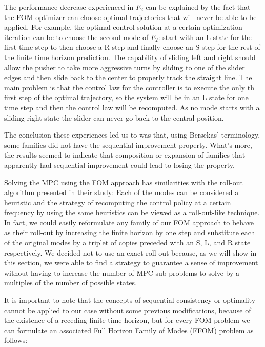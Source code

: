 \documentclass[12,twoside]{TFG-GM}
\theoremstyle{definition}
\theoremstyle{remark}
\begin{document}
The performance decrease experienced in $F_2$ can be explained by the fact that the FOM optimizer can choose optimal trajectories that will never be able to be applied. For example, the optimal control solution at a certain optimization iteration can be to choose the second mode of $F_2$: start with an L state for the first time step to then choose a R step and finally choose an S step for the rest of the finite time horizon prediction. The capability of sliding left and right should allow the pusher to take more aggressive turns by sliding to one of the slider edges and then slide back to the center to properly track the straight line. The main problem is that the control law for the controller is to execute the only th first step of the optimal trajectory, so the system will be in an L state for one time step and then the control law will be recomputed. As no mode starts with a sliding right state the slider can never go back to the central position.

The conclusion these experiences led us to was that, using Bersekas' terminology, some families did not have the sequential improvement property. What's more, the results seemed to indicate that composition or expansion of families that apparently had sequential improvement could lead to losing the property.

Solving the MPC using the FOM approach has similarities with the roll-out algorithm presented in their study: Each of the modes can be considered a heuristic and the strategy of recomputing the control policy at a certain frequency by using the same heuristics can be viewed as a roll-out-like technique. In fact, we could easily reformulate any family of our FOM approach to behave as their roll-out by increasing the finite horizon by one step and substitute each of the original modes by a triplet of copies preceded with an S, L, and R state respectively. We decided not to use an exact roll-out because, as we will show in this section, we were able to find a strategy to guarantee a sense of improvement without having to increase the number of MPC sub-problems to solve by a multiples of the number of possible states.

It is important to note that the concepts of sequential consistency or optimality cannot be applied to our case without some previous modifications, because of the existence of a receding finite time horizon, but for every FOM problem we can formulate an associated Full Horizon Family of Modes (FFOM) problem as follows:
\end{document}
